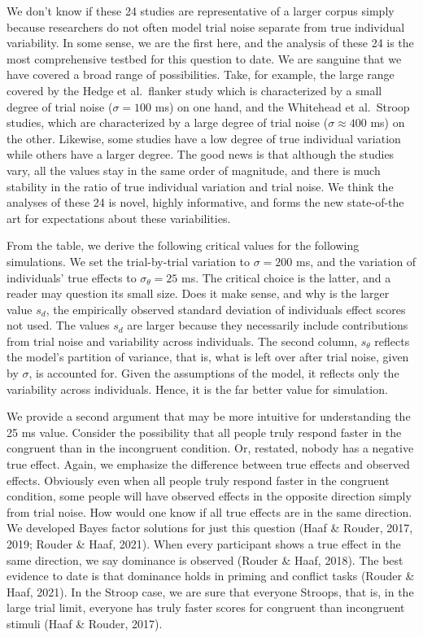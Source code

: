 \documentclass[
  english,
  ,man]{apa6}
\begin{document}
We don't know if these 24 studies are representative of a larger corpus simply because researchers do not often model trial noise separate from true individual variability. In some sense, we are the first here, and the analysis of these 24 is the most comprehensive testbed for this question to date. We are sanguine that we have covered a broad range of possibilities. Take, for example, the large range covered by the Hedge et al.~flanker study which is characterized by a small degree of trial noise (\(\sigma=100\) ms) on one hand, and the Whitehead et al.~Stroop studies, which are characterized by a large degree of trial noise (\(\sigma \approx 400\) ms) on the other. Likewise, some studies have a low degree of true individual variation while others have a larger degree. The good news is that although the studies vary, all the values stay in the same order of magnitude, and there is much stability in the ratio of true individual variation and trial noise. We think the analyses of these 24 is novel, highly informative, and forms the new state-of-the art for expectations about these variabilities.

From the table, we derive the following critical values for the following simulations. We set the trial-by-trial variation to \(\sigma= 200\) ms, and the variation of individuals' true effects to \(\sigma_\theta=25\) ms. The critical choice is the latter, and a reader may question its small size. Does it make sense, and why is the larger value \(s_d\), the empirically observed standard deviation of individuals effect scores not used. The values \(s_d\) are larger because they necessarily include contributions from trial noise and variability across individuals. The second column, \(s_\theta\) reflects the model's partition of variance, that is, what is left over after trial noise, given by \(\sigma\), is accounted for. Given the assumptions of the model, it reflects only the variability across individuals. Hence, it is the far better value for simulation.

We provide a second argument that may be more intuitive for understanding the 25 ms value. Consider the possibility that all people truly respond faster in the congruent than in the incongruent condition. Or, restated, nobody has a negative true effect. Again, we emphasize the difference between true effects and observed effects. Obviously even when all people truly respond faster in the congruent condition, some people will have observed effects in the opposite direction simply from trial noise. How would one know if all true effects are in the same direction. We developed Bayes factor solutions for just this question (Haaf \& Rouder, 2017, 2019; Rouder \& Haaf, 2021). When every participant shows a true effect in the same direction, we say dominance is observed (Rouder \& Haaf, 2018). The best evidence to date is that dominance holds in priming and conflict tasks (Rouder \& Haaf, 2021). In the Stroop case, we are sure that everyone Stroops, that is, in the large trial limit, everyone has truly faster scores for congruent than incongruent stimuli (Haaf \& Rouder, 2017).
\end{document}
